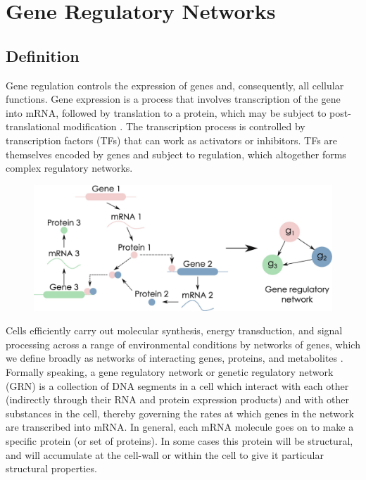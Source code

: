 \chapter{Gene Regulatory Networks}\label{grn}
\lhead[\fancyplain{}{\bfseries\thepage}]{\fancyplain{}{\bfseries\rightmark}}


\section{Definition}

Gene regulation controls the expression of genes and, consequently, all cellular functions. Gene expression is a process that involves transcription of the gene into mRNA, followed by translation to a protein, which may be subject to post-translational modification \cite{K40}. The transcription process is controlled by transcription factors (TFs) that can work as activators or inhibitors. TFs are themselves encoded by genes and subject to regulation, which altogether forms complex regulatory networks. 
\begin{figure}
\centering
\includegraphics{GRN.png}
\end{figure}
Cells efficiently carry out molecular synthesis, energy transduction, and signal processing across a range of environmental conditions by networks of genes, which we define broadly as networks of interacting genes, proteins, and metabolites \cite{K37}. Formally speaking, a gene regulatory network or genetic regulatory network (GRN) is a collection of DNA segments in a cell which interact with each other (indirectly through their RNA and protein expression products) and with other substances in the cell, thereby governing the rates at which genes in the network are transcribed into mRNA. In general, each mRNA molecule goes on to make a specific protein (or set of proteins). In some cases this protein will be structural, and will accumulate at the cell-wall or within the cell to give it particular structural properties. 



